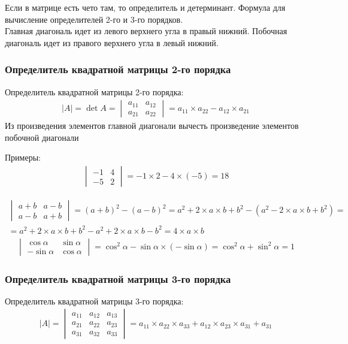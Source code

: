 \documentclass[a4paper, 11pt, oneside]{article}
\begin{document}
Если в матрице есть чето там, то определитель и детерминант. Формула для вычисление определителей 2-го и 3-го порядков.\\
Главная диагональ идет из левого верхнего угла в правый нижний. Побочная диагональ идет из правого верхнего угла в левый нижний.

\subsubsection{Определитель квадратной матрицы 2-го порядка}
Определитель квадратной матрицы 2-го порядка:
\begin{gather*}
	|A| = \det A = 
	\begin{vmatrix}
		a_{11}& a_{12}\\
		a_{21}& a_{22}
	\end{vmatrix}
	=
	a_{11}\times a_{22}-a_{12}\times a_{21}
\end{gather*}
Из произведения элементов главной диагонали вычесть произведение элементов побочной диагонали

Примеры:
\begin{gather*}
	\begin{vmatrix}
		-1& 4\\
		-5& 2
	\end{vmatrix}
	=
	-1\times 2-4\times (-5)=18
\end{gather*}

\begin{gather*}
	\begin{vmatrix}
		a+b& a-b\\
		a-b& a+b
	\end{vmatrix}
	=
	(a+b)^2-(a-b)^2 = a^2+2\times a\times b+b^2 - (a^2-2\times a\times b+b^2)
	=\\=
	a^2+2\times a\times b+b^2-a^2+2\times a\times b-b^2=4\times a\times b
\end{gather*}
\begin{gather*}
	\begin{vmatrix}
		\cos \alpha& \sin \alpha\\
		-\sin \alpha& \cos \alpha
	\end{vmatrix}
	=
	\cos^2 \alpha - \sin \alpha \times (-\sin \alpha) = \cos^2\alpha + \sin^2\alpha = 1
\end{gather*}

\subsubsection{Определитель квадратной матрицы 3-го порядка}
Определитель квадратной матрицы 3-го порядка:
\begin{gather*}
	|A|=
	\begin{vmatrix}
		a_{11}& a_{12}& a_{13}\\
		a_{21}& a_{22}& a_{23}\\
		a_{31}& a_{32}& a_{33}
	\end{vmatrix}
	=
	a_{11}\times a_{22}\times a_{33}+a_{12}\times a_{23}\times a_{31} + a_{31} 
\end{gather*}
\end{document}
